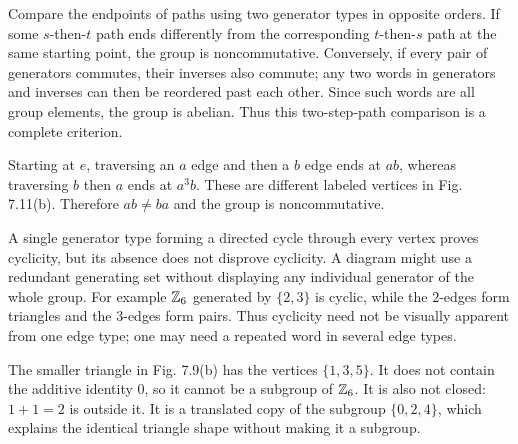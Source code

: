 
Compare the endpoints of paths using two generator types in opposite orders. If some $s$-then-$t$ path ends differently from the corresponding $t$-then-$s$ path at the same starting point, the group is noncommutative. Conversely, if every pair of generators commutes, their inverses also commute; any two words in generators and inverses can then be reordered past each other. Since such words are all group elements, the group is abelian. Thus this two-step-path comparison is a complete criterion.


Starting at $e$, traversing an $a$ edge and then a $b$ edge ends at $ab$, whereas traversing $b$ then $a$ ends at $a^3b$. These are different labeled vertices in Fig. 7.11(b). Therefore $ab\ne ba$ and the group is noncommutative.


A single generator type forming a directed cycle through every vertex proves cyclicity, but its absence does not disprove cyclicity. A diagram might use a redundant generating set without displaying any individual generator of the whole group. For example $\mathbb{Z}_6$ generated by $\{2,3\}$ is cyclic, while the $2$-edges form triangles and the $3$-edges form pairs. Thus cyclicity need not be visually apparent from one edge type; one may need a repeated word in several edge types.


The smaller triangle in Fig. 7.9(b) has the vertices $\{1,3,5\}$. It does not contain the additive identity $0$, so it cannot be a subgroup of $\mathbb{Z}_6$. It is also not closed: $1+1=2$ is outside it. It is a translated copy of the subgroup $\{0,2,4\}$, which explains the identical triangle shape without making it a subgroup.

